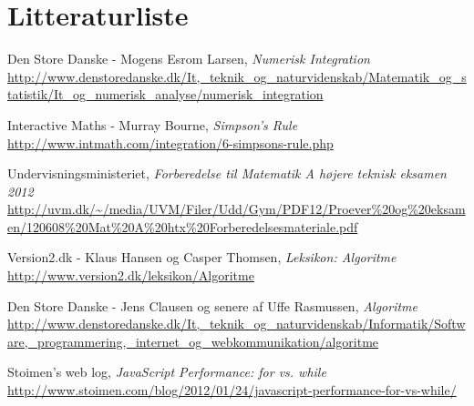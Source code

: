 \documentclass[12pt]{article}
\numberwithin{equation}{section}
\begin{document}
\section{Litteraturliste}
\begin{thebibliography}{9}
	Den Store Danske - Mogens Esrom Larsen,
	\emph{Numerisk Integration}
	\url{http://www.denstoredanske.dk/It,_teknik_og_naturvidenskab/Matematik_og_statistik/It_og_numerisk_analyse/numerisk_integration}
	

	Interactive Maths - Murray Bourne,
	\emph{Simpson's Rule}
	\url{http://www.intmath.com/integration/6-simpsons-rule.php}
	
	Undervisningsministeriet,
	\emph{Forberedelse til Matematik A højere teknisk eksamen 2012}
	\url{http://uvm.dk/~/media/UVM/Filer/Udd/Gym/PDF12/Proever\%20og\%20eksamen/120608\%20Mat\%20A\%20htx\%20Forberedelsesmateriale.pdf}
	
	Version2.dk - Klaus Hansen og Casper Thomsen,
	\emph{Leksikon: Algoritme}
	\url{http://www.version2.dk/leksikon/Algoritme}
	
	Den Store Danske - Jens Clausen og senere af Uffe Rasmussen,
	\emph{Algoritme}
	\url{http://www.denstoredanske.dk/It,_teknik_og_naturvidenskab/Informatik/Software,_programmering,_internet_og_webkommunikation/algoritme}

	Stoimen's web log,
	\emph{JavaScript Performance: for vs. while}
	\url{http://www.stoimen.com/blog/2012/01/24/javascript-performance-for-vs-while/}
\end{thebibliography}
\end{document}
